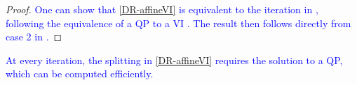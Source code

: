 \documentclass[letterpaper, 10 pt, conference]{ieeeconf}  %
\newcommand{\edit}[1]{\textcolor{blue}{#1}}
\newcommand{\emiliosay}[1]{\textcolor{ForestGreen}{[\textsc{Emilio:} #1]}}
\newcommand{\rezasay}[1]{\textcolor{DarkOrchid}{[\textsc{Reza:} #1]}}
\newcommand{\mc}{\mathcal}
\begin{document}
\begin{proof}
{\edit{One can show that \eqref{DR-affineVI} is equivalent to the iteration in \cite[Eqq. 30,31]{ferris1996operator}, following the equivalence of a QP to a VI \cite[\S 1.3.1]{facchinei2003finite}. The result then follows directly from case 2 in \cite[Proposition 6]{ferris1996operator}.}}    
\end{proof}
{\edit{At every iteration, the splitting in \eqref{DR-affineVI} requires the solution to a QP, which can be computed efficiently. }

}
\end{document}
